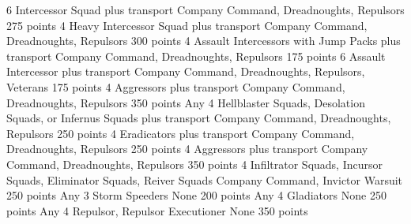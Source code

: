 \documentclass[a4paper, twocolumn]{article}
\begin{document}

          {6 Intercessor Squad plus transport}
          {Company Command, Dreadnoughts, Repulsors}
          {275 points}
          {4 Heavy Intercessor Squad plus transport}
          {Company Command, Dreadnoughts, Repulsors}
          {300 points}
          {4 Assault Intercessors with Jump Packs plus transport}
          {Company Command, Dreadnoughts, Repulsors}
          {175 points}
          {6 Assault Intercessor plus transport}
          {Company Command, Dreadnoughts, Repulsors, Veterans}
          {175 points}
          {4 Aggressors plus transport}
          {Company Command, Dreadnoughts, Repulsors}
          {350 points}
          {Any 4 Hellblaster Squads, Desolation Squads, or Infernus Squads plus transport}
          {Company Command, Dreadnoughts, Repulsors}
          {250 points}
          {4 Eradicators plus transport}
          {Company Command, Dreadnoughts, Repulsors}
          {250 points}
          {4 Aggressors plus transport}
          {Company Command, Dreadnoughts, Repulsors}
          {350 points}
          {4 Infiltrator Squads, Incursor Squads, Eliminator Squads, Reiver Squads}
          {Company Command, Invictor Warsuit}
          {250 points}
          {Any 3 Storm Speeders}
          {None}
          {200 points}
          {Any 4 Gladiators}
          {None}
          {250 points}
          {Any 4 Repulsor, Repulsor Executioner}
          {None}
          {350 points}
\formationsEND

\upgradesEND

\twocolumn			%
\end{document}
